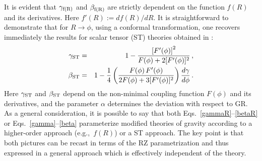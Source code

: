 \documentclass[a4paper,aps,twocolumn,showpacs,showkeys,nofootinbib,preprintnumbers,superscriptaddress,amsmath,amssymb,amsfonts]{revtex4-1}
\newcommand{\eg}{{e.g.,}~}
\begin{document}
%
It is evident that $\gamma_{\rm f(R)}$ and $\beta_{\rm f(R)}$ are strictly
dependent on the function $f(R)$ and its derivatives.
Here $f'(R):=df(R)/dR$. It is straightforward to demonstrate that for
$R\rightarrow\phi$, using a conformal transformation, one recovers
immediately the results for scalar tensor (ST) theories obtained in
\cite{Damour2007}:
\begin{eqnarray}
\label{gamma}
\gamma_{{\rm ST}} &=& 1 -\frac{\left[F'(\phi)\right]^2}{F(\phi)+2[F'(\phi)]^2}\,, \\ 
\beta_{{\rm ST}}
&=& 1 - \frac{1}{4} \left( \frac{F(\phi)\, F'(\phi)}{2F(\phi)+
  3[F'(\phi)]^2} \right) \frac{d\gamma}{d\phi}\,. \label{beta}
\end{eqnarray}
%
Here $\gamma_{{\rm ST}}$ and $\beta_{{\rm ST}}$
depend on the non-minimal coupling function $F(\phi)$ and its derivatives, and the
parameter $\alpha$ determines the deviation with respect to GR.
As a general consideration, it is
possible to say that both Eqs.~\eqref{gammaR}--\eqref{betaR} or
Eqs.~\eqref{gamma}--\eqref{beta} parameterize modified theories of
gravity according to a higher-order approach (\eg $f(R)$) or a
ST approach. The key point is that both pictures can be recast
in terms of the RZ parametrization and thus expressed in a general
approach which is effectively independent of the theory.
\end{document}
